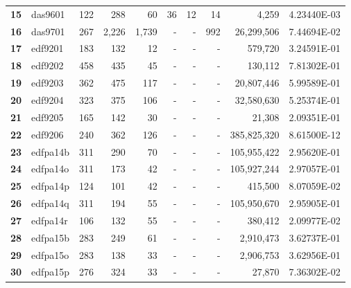 \begin{longtable}{@{}llrrrrrrrc@{}}
\textbf{15} & das9601  & 122                  & 288      & 60      & 36   & 12   & 14    & 4,259                & 4.23440E-03 \\
\textbf{16} & das9701  & 267                  & 2,226    & 1,739   & -    & -    & 992   & 26,299,506           & 7.44694E-02 \\
\textbf{17} & edf9201  & 183                  & 132      & 12      & -    & -    & -     & 579,720              & 3.24591E-01 \\
\textbf{18} & edf9202  & 458                  & 435      & 45      & -    & -    & -     & 130,112              & 7.81302E-01 \\
\textbf{19} & edf9203  & 362                  & 475      & 117     & -    & -    & -     & 20,807,446           & 5.99589E-01 \\
\textbf{20} & edf9204  & 323                  & 375      & 106     & -    & -    & -     & 32,580,630           & 5.25374E-01 \\
\textbf{21} & edf9205  & 165                  & 142      & 30      & -    & -    & -     & 21,308               & 2.09351E-01 \\
\textbf{22} & edf9206  & 240                  & 362      & 126     & -    & -    & -     & 385,825,320          & 8.61500E-12 \\
\textbf{23} & edfpa14b & 311                  & 290      & 70      & -    & -    & -     & 105,955,422          & 2.95620E-01 \\
\textbf{24} & edfpa14o & 311                  & 173      & 42      & -    & -    & -     & 105,927,244          & 2.97057E-01 \\
\textbf{25} & edfpa14p & 124                  & 101      & 42      & -    & -    & -     & 415,500              & 8.07059E-02 \\
\textbf{26} & edfpa14q & 311                  & 194      & 55      & -    & -    & -     & 105,950,670          & 2.95905E-01 \\
\textbf{27} & edfpa14r & 106                  & 132      & 55      & -    & -    & -     & 380,412              & 2.09977E-02 \\
\textbf{28} & edfpa15b & 283                  & 249      & 61      & -    & -    & -     & 2,910,473            & 3.62737E-01 \\
\textbf{29} & edfpa15o & 283                  & 138      & 33      & -    & -    & -     & 2,906,753            & 3.62956E-01 \\
\textbf{30} & edfpa15p & 276                  & 324      & 33      & -    & -    & -     & 27,870               & 7.36302E-02 \\

\end{longtable}
